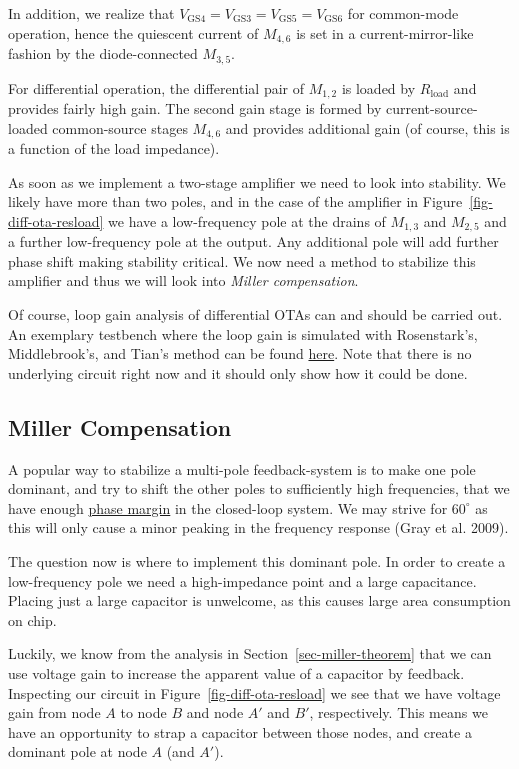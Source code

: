 \documentclass[
  a4paper,
  DIV=11,
  numbers=noendperiod]{scrartcl}
\begin{document}
In addition, we realize that
\(V_\mathrm{GS4} = V_\mathrm{GS3} = V_\mathrm{GS5} = V_\mathrm{GS6}\)
for common-mode operation, hence the quiescent current of \(M_{4,6}\) is
set in a current-mirror-like fashion by the diode-connected \(M_{3,5}\).

For differential operation, the differential pair of \(M_{1,2}\) is
loaded by \(R_\mathrm{load}\) and provides fairly high gain. The second
gain stage is formed by current-source-loaded common-source stages
\(M_{4,6}\) and provides additional gain (of course, this is a function
of the load impedance).

As soon as we implement a two-stage amplifier we need to look into
stability. We likely have more than two poles, and in the case of the
amplifier in Figure~\ref{fig-diff-ota-resload} we have a low-frequency
pole at the drains of \(M_{1,3}\) and \(M_{2,5}\) and a further
low-frequency pole at the output. Any additional pole will add further
phase shift making stability critical. We now need a method to stabilize
this amplifier and thus we will look into \emph{Miller compensation}.

Of course, loop gain analysis of differential OTAs can and should be
carried out. An exemplary testbench where the loop gain is simulated
with Rosenstark's, Middlebrook's, and Tian's method can be found
\href{xschem/ota-differential_tb-loopgain.sch}{here}. Note that there is
no underlying circuit right now and it should only show how it could be
done.

\subsection{Miller Compensation}\label{miller-compensation}

A popular way to stabilize a multi-pole feedback-system is to make one
pole dominant, and try to shift the other poles to sufficiently high
frequencies, that we have enough
\href{https://en.wikipedia.org/wiki/Phase_margin}{phase margin} in the
closed-loop system. We may strive for \(60^\circ\) as this will only
cause a minor peaking in the frequency response (Gray et al. 2009).

The question now is where to implement this dominant pole. In order to
create a low-frequency pole we need a high-impedance point and a large
capacitance. Placing just a large capacitor is unwelcome, as this causes
large area consumption on chip.

Luckily, we know from the analysis in Section~\ref{sec-miller-theorem}
that we can use voltage gain to increase the apparent value of a
capacitor by feedback. Inspecting our circuit in
Figure~\ref{fig-diff-ota-resload} we see that we have voltage gain from
node \(A\) to node \(B\) and node \(A'\) and \(B'\), respectively. This
means we have an opportunity to strap a capacitor between those nodes,
and create a dominant pole at node \(A\) (and \(A'\)).
\end{document}
